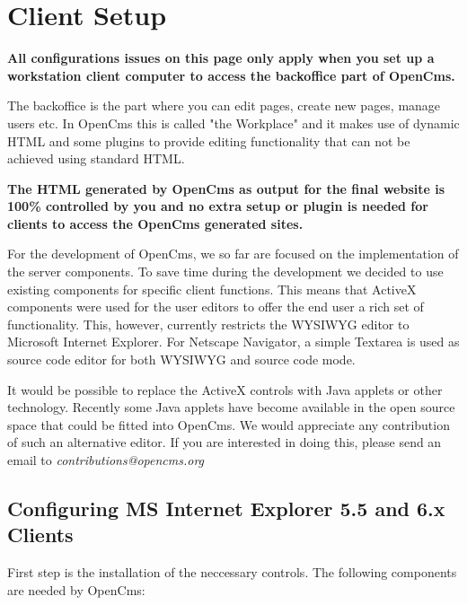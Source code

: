 \chapter{Client Setup}
\label{Client Setup}

\textbf{All configurations issues on this page only apply when you
set up a workstation client computer to access the backoffice part of OpenCms.}

The backoffice is the part where you can edit pages, create new pages,
manage users etc. In OpenCms this is called "the Workplace" and it
makes use of dynamic HTML and some plugins to provide editing
functionality that can not be achieved using standard HTML.

\textbf{The HTML generated by OpenCms as output for the final
website is 100\% controlled by you and no extra setup or
plugin is needed for clients to access the OpenCms generated sites.}

For the development of OpenCms, we so far are focused on the
implementation of the server components. To save time during the
development we decided to use existing components for specific
client functions. This means that ActiveX components were used for
the user editors to offer the end user a rich set of
functionality. This, however, currently restricts the WYSIWYG
editor to Microsoft Internet Explorer. For Netscape Navigator, a
simple Textarea is used as source code editor for both WYSIWYG and
source code mode.

It would be possible to replace the ActiveX controls with Java
applets or other technology. Recently some Java applets have become available
in the open source space that could be fitted into OpenCms. 
We would appreciate any contribution of such an alternative editor.
If you are interested in doing this, please send an email 
to {\em contributions@opencms.org}


\section{Configuring MS Internet Explorer 5.5 and 6.x Clients}
\label{browsersettings}

First step is the installation of the neccessary controls. 
The following components are needed by OpenCms:

